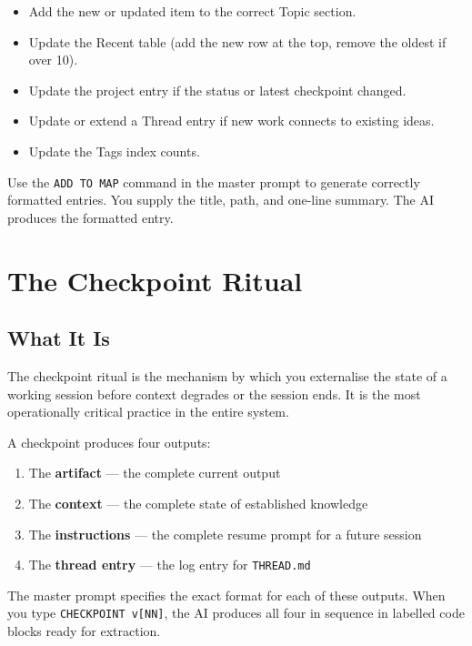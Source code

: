 \documentclass[12pt,letterpaper]{article}
\begin{document}
\begin{itemize}
  \item Add the new or updated item to the correct Topic section.
  \item Update the Recent table (add the new row at the top, remove the oldest if over 10).
  \item Update the project entry if the status or latest checkpoint changed.
  \item Update or extend a Thread entry if new work connects to existing ideas.
  \item Update the Tags index counts.
\end{itemize}

Use the \texttt{ADD TO MAP} command in the master prompt to generate correctly
formatted entries. You supply the title, path, and one-line summary.
The AI produces the formatted entry.

\section{The Checkpoint Ritual}

\subsection{What It Is}

The checkpoint ritual is the mechanism by which you externalise the state of
a working session before context degrades or the session ends. It is the
most operationally critical practice in the entire system.

A checkpoint produces four outputs:

\begin{enumerate}
  \item The \textbf{artifact} --- the complete current output
  \item The \textbf{context} --- the complete state of established knowledge
  \item The \textbf{instructions} --- the complete resume prompt for a future session
  \item The \textbf{thread entry} --- the log entry for \texttt{THREAD.md}
\end{enumerate}

The master prompt specifies the exact format for each of these outputs.
When you type \texttt{CHECKPOINT v[NN]}, the AI produces all four in
sequence in labelled code blocks ready for extraction.
\end{document}
